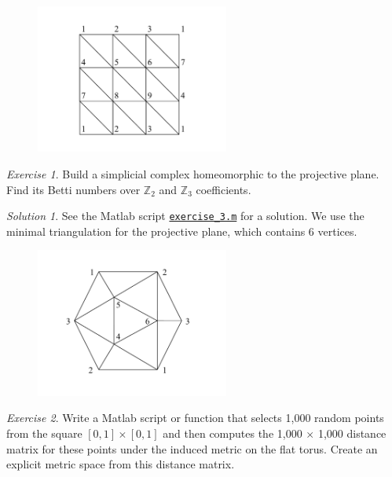 \documentclass[amscd, amssymb, verbatim]{amsart}[12pt]
\theoremstyle{remark}
\theoremstyle{remark}
\newtheorem{exerciseSol}{Exercise}
\theoremstyle{remark}
\newtheorem*{solution}{Solution}
\begin{document}
\begin{figure}[htp]
  \begin{center}
    \includegraphics[width=2.5in]{klein}
   \end{center}
\end{figure}
\FloatBarrier

\begin{exerciseSol}
Build a simplicial complex homeomorphic to the projective plane. Find its Betti numbers over $\mathbb{Z}_2$ and $\mathbb{Z}_3$ coefficients.
\end{exerciseSol}

\begin{solution}
See the Matlab script \href{https://github.com/appliedtopology/javaplex/tree/master/src/matlab/for_distribution/tutorial_solutions/exercise_3.m}{\texttt{exercise\_3.m}} for a solution. We use the minimal triangulation for the projective plane, which contains 6 vertices.
\end{solution}

\begin{figure}[htp]
  \begin{center}
    \includegraphics[width=2.5in]{projPlane}
   \end{center}
\end{figure}
\FloatBarrier

\begin{exerciseSol}
Write a Matlab script or function that selects 1,000 random points from the square $[0, 1] \times [0, 1]$ and then computes the 1,000 $\times$ 1,000 distance matrix for these points under the induced metric on the flat torus. Create an explicit metric space from this distance matrix.
\end{exerciseSol}
\end{document}
